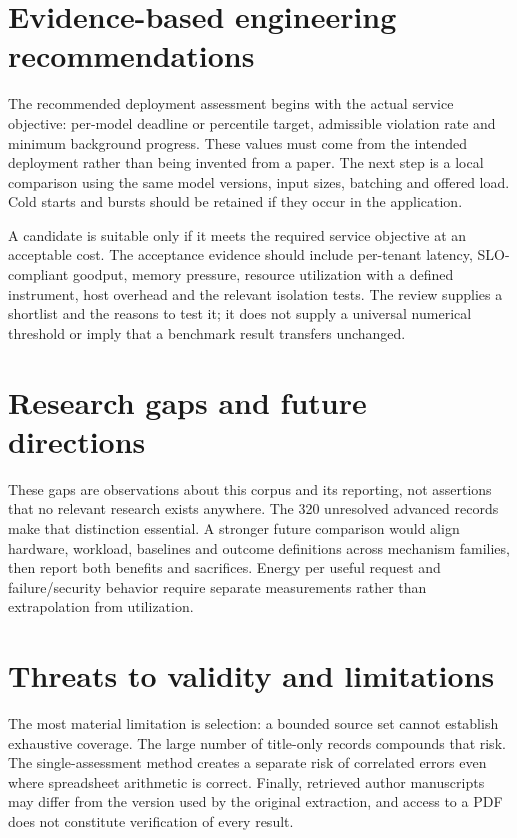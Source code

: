 \section{Evidence-based engineering recommendations}

The recommended deployment assessment begins with the actual service objective: per-model deadline or percentile target, admissible violation rate and minimum background progress. These values must come from the intended deployment rather than being invented from a paper. The next step is a local comparison using the same model versions, input sizes, batching and offered load. Cold starts and bursts should be retained if they occur in the application.

A candidate is suitable only if it meets the required service objective at an acceptable cost. The acceptance evidence should include per-tenant latency, SLO-compliant goodput, memory pressure, resource utilization with a defined instrument, host overhead and the relevant isolation tests. The review supplies a shortlist and the reasons to test it; it does not supply a universal numerical threshold or imply that a benchmark result transfers unchanged.

\section{Research gaps and future directions}

These gaps are observations about this corpus and its reporting, not assertions that no relevant research exists anywhere. The 320 unresolved advanced records make that distinction essential. A stronger future comparison would align hardware, workload, baselines and outcome definitions across mechanism families, then report both benefits and sacrifices. Energy per useful request and failure/security behavior require separate measurements rather than extrapolation from utilization.

\section{Threats to validity and limitations}

The most material limitation is selection: a bounded source set cannot establish exhaustive coverage. The large number of title-only records compounds that risk. The single-assessment method creates a separate risk of correlated errors even where spreadsheet arithmetic is correct. Finally, retrieved author manuscripts may differ from the version used by the original extraction, and access to a PDF does not constitute verification of every result.

